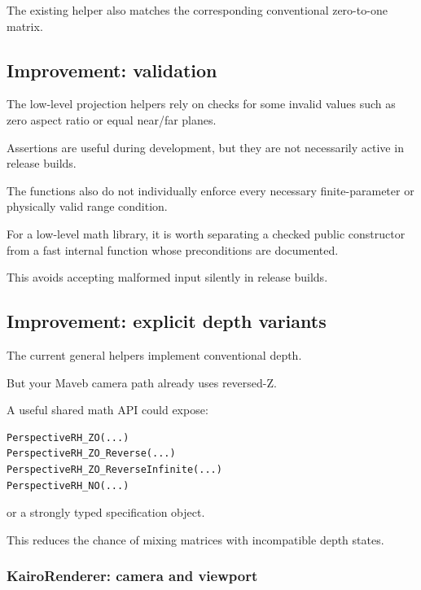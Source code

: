 The existing  helper also matches the corresponding conventional zero-to-one matrix.

\subsection{Improvement: validation}\label{02-foundations-ii-ch037-improvement-validation}

\hypertarget{02-foundations-ii-ch037-improvement-validation}{}

The low-level projection helpers rely on  checks for some invalid values such as zero aspect ratio or equal near/far planes.

Assertions are useful during development, but they are not necessarily active in release builds.

The functions also do not individually enforce every necessary finite-parameter or physically valid range condition.

For a low-level math library, it is worth separating a checked public constructor from a fast internal function whose preconditions are documented.

This avoids accepting malformed input silently in release builds.

\subsection{Improvement: explicit depth variants}\label{02-foundations-ii-ch037-improvement-explicit-depth-variants}

\hypertarget{02-foundations-ii-ch037-improvement-explicit-depth-variants}{}

The current general helpers implement conventional depth.

But your Maveb camera path already uses reversed-Z.

A useful shared math API could expose:

\begin{verbatim}
PerspectiveRH_ZO(...)
PerspectiveRH_ZO_Reverse(...)
PerspectiveRH_ZO_ReverseInfinite(...)
PerspectiveRH_NO(...)
\end{verbatim}

or a strongly typed specification object.

This reduces the chance of mixing matrices with incompatible depth states.

\subsubsection{KairoRenderer: camera and viewport}\label{02-foundations-ii-ch037-kairorenderer-camera-and-viewport}

